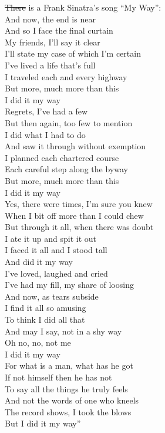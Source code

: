 \documentclass[10pt, letterpaper]{article}
\providecommand{\DIFaddtex}[1]{{\protect\color{blue}\uwave{#1}}} %
\providecommand{\DIFdeltex}[1]{{\protect\color{red}\sout{#1}}}                      %
\providecommand{\DIFaddbegin}{} %
\providecommand{\DIFaddend}{} %
\providecommand{\DIFdelbegin}{} %
\providecommand{\DIFdelend}{} %
\providecommand{\DIFadd}[1]{\texorpdfstring{\DIFaddtex{#1}}{#1}} %
\providecommand{\DIFdel}[1]{\texorpdfstring{\DIFdeltex{#1}}{}} %
\newcommand{\DIFscaledelfig}{0.5}
\newlength{\DIFdelgraphicswidth} %
\newlength{\DIFdelgraphicsheight} %
\newcommand{\DIFaddincludegraphics}[2][]{{\color{blue}\fbox{\DIFOincludegraphics[#1]{#2}}}} %
\newcommand{\DIFdelincludegraphics}[2][]{%
\sbox{\DIFdelgraphicsbox}{\DIFOincludegraphics[#1]{#2}}%
\settoboxwidth{\DIFdelgraphicswidth}{\DIFdelgraphicsbox} %
\settoboxtotalheight{\DIFdelgraphicsheight}{\DIFdelgraphicsbox} %
\scalebox{\DIFscaledelfig}{%
\parbox[b]{\DIFdelgraphicswidth}{\usebox{\DIFdelgraphicsbox}\\[-\baselineskip] \rule{\DIFdelgraphicswidth}{0em}}\llap{\resizebox{\DIFdelgraphicswidth}{\DIFdelgraphicsheight}{%
\setlength{\unitlength}{\DIFdelgraphicswidth}%
\begin{picture}(1,1)%
\thicklines\linethickness{2pt} %
{\color[rgb]{1,0,0}\put(0,0){\framebox(1,1){}}}%
{\color[rgb]{1,0,0}\put(0,0){\line( 1,1){1}}}%
{\color[rgb]{1,0,0}\put(0,1){\line(1,-1){1}}}%
\end{picture}%
}\hspace*{3pt}}} %
} %
\DeclareRobustCommand{\DIFaddbegin}{\DIFOaddbegin \let\includegraphics\DIFaddincludegraphics} %
\DeclareRobustCommand{\DIFaddend}{\DIFOaddend \let\includegraphics\DIFOincludegraphics} %
\DeclareRobustCommand{\DIFdelbegin}{\DIFOdelbegin \let\includegraphics\DIFdelincludegraphics} %
\DeclareRobustCommand{\DIFdelend}{\DIFOaddend \let\includegraphics\DIFOincludegraphics} %
\begin{document}
\begin{spacing}{1.8}
\DIFaddbegin \noindent \DIFadd{To this point, }\DIFaddend {\DIFdelbegin \DIFdel{There }\DIFdelend \DIFaddbegin \DIFadd{there }\DIFaddend is a Frank Sinatra's song ``My Way'':\\
And now, the end is near\\
And so I face the final curtain\\
My friends, I'll say it clear\\
I'll state my case of which I'm certain\\
I've lived a life that's full\\
I traveled each and every highway\\
But more, much more than this\\
I did it my way\\
Regrets, I've had a few\\
But then again, too few to mention\\
I did what I had to do\\
And saw it through without exemption\\
I planned each chartered course\\
Each careful step along the byway\\
But more, much more than this\\
I did it my way\\
Yes, there were times, I'm sure you knew\\
When I bit off more than I could chew\\
But through it all, when there was doubt\\
I ate it up and spit it out\\
I faced it all and I stood tall\\
And did it my way\\
I've loved, laughed and cried\\
I've had my fill, my share of loosing\\
And now, as tears subside\\
I find it all so amusing\\
To think I did all that\\
And may I say, not in a shy way\\
Oh no, no, not me\\
I did it my way\\
For what is a man, what has he got\\
If not himself then he has not\\
To say all the things he truly feels\\
And not the words of one who kneels\\
The record shows, I took the blows\\
But I did it my way''}\\



\end{spacing}
\end{document}

